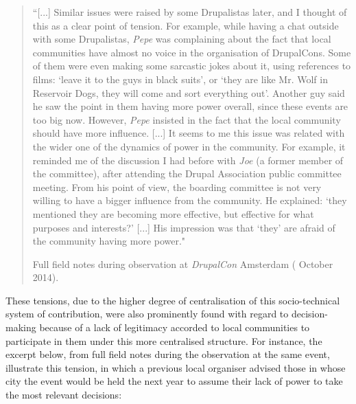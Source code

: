\begin{quotation}
``[...] Similar issues were raised by some Drupalistas later, and I thought of this as a clear point of tension. For example, while having a chat outside with some Drupalistas, \textit{Pepe} was complaining about the fact that local communities have almost no voice in the organisation of DrupalCons. Some of them were even making some sarcastic jokes about it, using references to films: `leave it to the guys in black suits', or `they are like Mr. Wolf in Reservoir Dogs, they will come and sort everything out'. Another guy said he saw the point in them having more power overall, since these events are too big now. However, \textit{Pepe} insisted in the fact that the local community should have more influence. [...]
It seems to me this issue was related with the wider one of the dynamics of power in the community. For example, it reminded me of the discussion I had before with \textit{Joe} (a former member of the committee), after attending the Drupal Association public committee meeting. From his point of view, the boarding committee is not very willing to have a bigger influence from the community. He explained: `they mentioned they are becoming more effective, but effective for what purposes and interests?' [...] His impression was that `they' are afraid of the community having more power."

\begin{flushright}\footnotesize{Full field notes during observation at \textit{DrupalCon} Amsterdam ( October 2014).}\end{flushright}
\end{quotation}

These tensions, due to the higher degree of centralisation of this socio-technical system of contribution, were also prominently found with regard to decision-making because of a lack of legitimacy accorded to local communities to participate in them under this more centralised structure. For instance, the excerpt below, from full field notes during the observation at the same event, illustrate this tension, in which a previous local organiser advised those in whose city the event would be held the next year to assume their lack of power to take the most relevant decisions:

